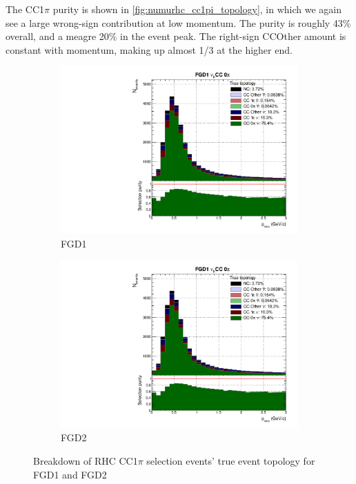 The CC1$\pi$ purity is shown in \autoref{fig:numurhc_cc1pi_topology}, in which we again see a large wrong-sign contribution at low momentum. The purity is roughly 43\% overall, and a meagre 20\% in the event peak. The right-sign CCOther amount is constant with momentum, making up almost 1/3 at the higher end.
\begin{figure}[h]
	\begin{subfigure}[t]{0.49\textwidth}
		\includegraphics[width=\textwidth,page=27, trim={0mm 0mm 0mm 9mm}, clip]{figures/mach3/2018/Selection/2018_FullNoRedNDmatrix_rebin_verbose_may_diagnostics}
		\caption{FGD1}
	\end{subfigure}
	\begin{subfigure}[t]{0.49\textwidth}
		\includegraphics[width=\textwidth,page=33, trim={0mm 0mm 0mm 9mm}, clip]{figures/mach3/2018/Selection/2018_FullNoRedNDmatrix_rebin_verbose_may_diagnostics}
		\caption{FGD2}
	\end{subfigure}
	\caption{Breakdown of \numu RHC CC1$\pi$ selection events' true event topology for FGD1 and FGD2 }
	\label{fig:numurhc_cc1pi_topology}
\end{figure}

